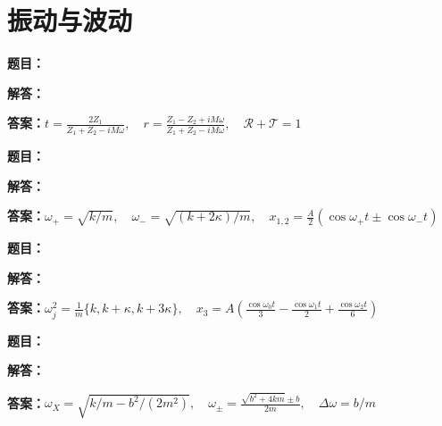 \documentclass[lang=cn,color=blue,11pt]{elegantbook}
\begin{document}
\chapter{振动与波动}

\par
\noindent\textbf{题目：}
\par\noindent\textbf{解答：}
\par\noindent\textbf{答案：}\(\displaystyle t=\frac{2Z_1}{Z_1+Z_2-iM\omega},\quad r=\frac{Z_1-Z_2+iM\omega}{Z_1+Z_2-iM\omega},\quad \mathcal R+\mathcal T=1\)\par
\par\smallskip\noindent\hrulefill\par\medskip
{}\par
\noindent\textbf{题目：}
\par\noindent\textbf{解答：}
\par\noindent\textbf{答案：}\(\displaystyle \omega_+=\sqrt{k/m},\quad \omega_-=\sqrt{(k+2\kappa)/m},\quad x_{1,2}=\frac A2(\cos\omega_+t\pm\cos\omega_-t)\)\par
\par\smallskip\noindent\hrulefill\par\medskip
{}\par
\noindent\textbf{题目：}
\par\noindent\textbf{解答：}
\par\noindent\textbf{答案：}\(\displaystyle \omega_j^2=\frac1m\{k,k+\kappa,k+3\kappa\},\quad x_3=A\left(\frac{\cos\omega_0t}{3}-\frac{\cos\omega_1t}{2}+\frac{\cos\omega_2t}{6}\right)\)\par
\par\smallskip\noindent\hrulefill\par\medskip
{}\par
\noindent\textbf{题目：}
\par\noindent\textbf{解答：}
\par\noindent\textbf{答案：}\(\displaystyle \omega_X=\sqrt{k/m-b^2/(2m^2)},\quad \omega_{\pm}=\frac{\sqrt{b^2+4km}\pm b}{2m},\quad\Delta\omega=b/m\)\par
\end{document}
